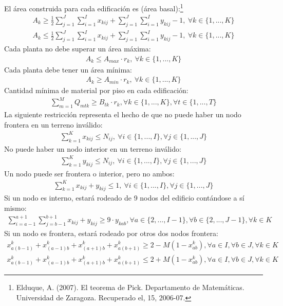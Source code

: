 \documentclass[letterpaper]{article}
\begin{document}
El área construida para cada edificación es (área basal):\footnote{Elduque, A. (2007). El teorema de Pick. Departamento de Matemáticas. Universidad de Zaragoza. Recuperado el, 15, 2006-07.}
\begin{gather}
	A_{k} \geq \frac{1}{2} \sum_{j=1}^{J} \sum_{i=1}^{I} x_{kij} + \sum_{j=1}^{J} \sum_{i=1}^{I} y_{kij} - 1, \ \forall k \in \{1,...,K\}\\
	A_{k} \leq \frac{1}{2} \sum_{j=1}^{J} \sum_{i=1}^{I} x_{kij} + \sum_{j=1}^{J} \sum_{i=1}^{I} y_{kij} - 1, \ \forall k \in \{1,...,K\}
\end{gather}
Cada planta no debe superar un área máxima:
\begin{gather}
	A_{k} \leq A_{max} \cdot r_{k}, \ \forall k \in \{1,...,K\}
\end{gather}
Cada planta debe tener un área mínima:
\begin{gather}
	A_{k} \geq A_{min} \cdot r_{k},  \ \forall k \in \{1,...,K\}
\end{gather}
Cantidad mínima de material por piso en cada edificación:
\begin{gather}
 	\sum_{m=1}^{M} Q_{mtk} \geq B_{tk} \cdot r_{k} , \forall k \in \{1,...,K\}, \forall t \in \{1,...,T\}
\end{gather}
La siguiente restricción representa el hecho de que no puede haber un nodo frontera en un terreno inválido:
\begin{gather}
	\sum_{k=1}^{K} x_{kij} \leq N_{ij}, \ \forall i \in \{1,...,I\}, \forall j \in \{1,...,J\}
\end{gather}
No puede haber un nodo interior en un terreno inválido:
\begin{gather}
	\sum_{k=1}^{K} y_{kij} \leq N_{ij}, \ \forall i \in \{1,...,I\}, \forall j \in \{1,...,J\}
\end{gather}
Un nodo puede ser frontera o interior, pero no ambos:
\begin{gather}
	\sum_{k=1}^{K} x_{kij} + y_{kij} \leq 1, \ \forall i \in \{1,...,I\}, \forall j \in \{1,...,J\}
\end{gather}
Si un nodo es interno, estará rodeado de 9 nodos del edificio contándose a sí mismo:
\begin{gather}
	\sum_{i=a-1}^{a+1} \sum_{j=b-1}^{b+1} x_{kij} + y_{kij} \geq 9 \cdot y_{kab}, \forall a \in \{2,...,I-1\}, \forall b \in \{2,...,J-1\}, \forall k \in K
\end{gather}
Si un nodo es frontera, estará rodeado por otros dos nodos frontera:
\begin{gather}
	x_{a(b-1)}^{k} + x_{(a-1)b}^{k} + x_{(a+1)b}^{k} + x_{a(b+1)}^{k} \geq 2 - M(1-x_{ab}^{k}), \forall a \in I, \forall b \in J, \forall k \in K\\
	x_{a(b-1)}^{k} + x_{(a-1)b}^{k} + x_{(a+1)b}^{k} + x_{a(b+1)}^{k} \leq 2 + M(1-x_{ab}^{k}), \forall a \in I, \forall b \in J, \forall k \in K
\end{gather}
\end{document}
